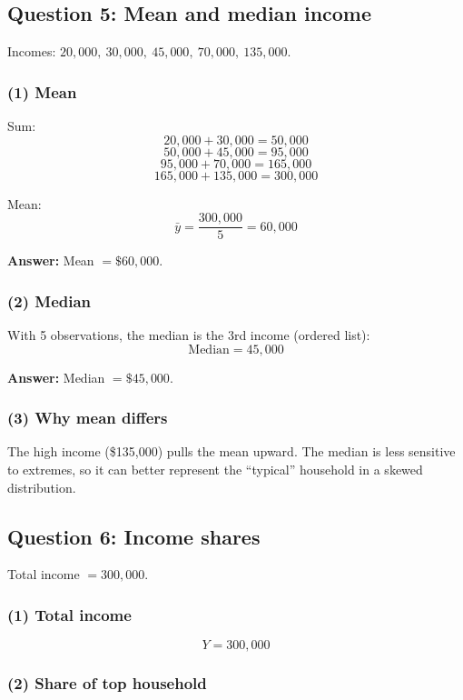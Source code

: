 \documentclass[11pt]{article}
\begin{document}
\subsection*{Question 5: Mean and median income}

Incomes: \(20{,}000,\ 30{,}000,\ 45{,}000,\ 70{,}000,\ 135{,}000\).

\subsubsection*{(1) Mean}

Sum:
\[
20{,}000+30{,}000=50{,}000
\]
\[
50{,}000+45{,}000=95{,}000
\]
\[
95{,}000+70{,}000=165{,}000
\]
\[
165{,}000+135{,}000=300{,}000
\]

Mean:
\[
\bar{y}=\frac{300{,}000}{5}=60{,}000
\]

\textbf{Answer:} Mean \(=\$60{,}000\).

\subsubsection*{(2) Median}

With 5 observations, the median is the 3rd income (ordered list):
\[
\text{Median}=45{,}000
\]

\textbf{Answer:} Median \(=\$45{,}000\).

\subsubsection*{(3) Why mean differs}

The high income (\$135,000) pulls the mean upward. The median is less sensitive to extremes, so it can better represent the “typical” household in a skewed distribution.

\newpage
\subsection*{Question 6: Income shares}

Total income \(=300{,}000\).

\subsubsection*{(1) Total income}

\[
Y=300{,}000
\]

\subsubsection*{(2) Share of top household}
\end{document}
